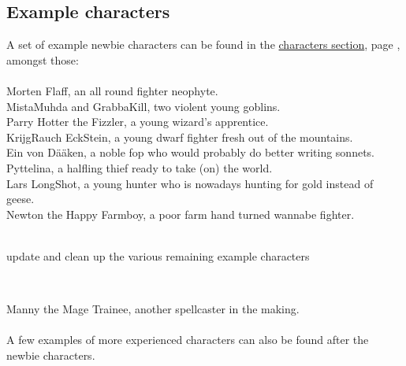 \normalsize






\subsection*{Example characters}

A set of example newbie characters can be found in the 
\hyperref[cpt:characters]{characters section}, 
page \pageref{cpt:characters}, 
amongst those: \\
 \\
Morten Flaff, an all round fighter neophyte. \\
MistaMuhda and GrabbaKill, two violent young goblins. \\
Parry Hotter the Fizzler, a young wizard's apprentice. \\
KrijgRauch EckStein, a young dwarf fighter fresh out of the mountains. \\
Ein von Dääken, a noble fop who would probably do better writing sonnets. \\
Pyttelina, a halfling thief ready to take (on) the world. \\
Lars LongShot, a young hunter who is nowadays hunting for gold instead of geese. \\
Newton the Happy Farmboy, a poor farm hand turned wannabe fighter. \\

\

\todo update and clean up the various remaining example characters

\

\noindent
Manny the Mage Trainee, another spellcaster in the making. \\
 \\
A few examples of more experienced characters can also be found after the newbie characters.











